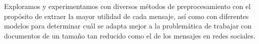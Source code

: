 \documentclass[oneside]{prgrado}
\begin{document}
Exploramos y experimentamos con diversos métodos de preprocesamiento con el propósito de extraer la mayor utilidad de cada mensaje, así como con diferentes modelos para determinar cuál se adapta mejor a la problemática de trabajar con documentos de un tamaño tan reducido como el de los mensajes en redes sociales.

\hfill \break
{}


\tableofcontents
\newpage



\mainmatter %
















{ %

\backmatter %


\newpage



} %




\end{document}
